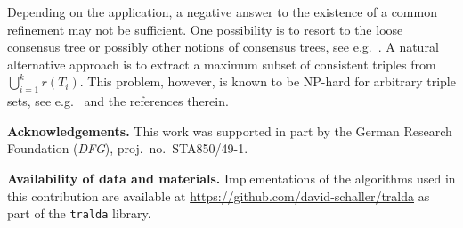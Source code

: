 \documentclass[11pt]{article}
\begin{document}
Depending on the application, a negative answer to the existence of a
common refinement may not be sufficient. One possibility is to resort to
the loose consensus tree or possibly other notions of consensus trees, see
e.g.\ \cite{Bremer:90,Bryant:03}. A natural alternative approach is to
extract a maximum subset of consistent triples from
$\bigcup_{i=1}^k r(T_i)$. This problem, however, is known to be NP-hard for
arbitrary triple sets, see e.g.\ \cite{Byrka:10} and the references
therein. 



\bigskip\noindent
\textbf{Acknowledgements.} 
This work was supported in part by the German Research Foundation
(\emph{DFG}), proj.\ no.\ STA850/49-1.

\bigskip\noindent
\textbf{Availability of data and materials.}
Implementations of the algorithms used in this contribution are available
at \url{https://github.com/david-schaller/tralda} as part of the
\texttt{tralda} library.

%

\end{document}
